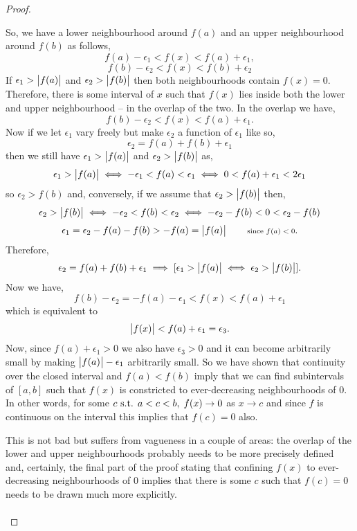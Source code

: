 \documentclass[../MathsNotesBase.tex]{subfiles}
\begin{document}
{\begin{proof}
\begin{displayquote}
				So, we have a lower neighbourhood around $f(a)$ and an upper neighbourhood around $f(b)$ as follows,
				\[ f(a) - \epsilon_1 < f(x) < f(a) + \epsilon_1, \]
				\[ f(b) - \epsilon_2 < f(x) < f(b) + \epsilon_2 \]
				If ${ \epsilon_1 > \left\lvert f(a)\right\rvert }$ and ${ \epsilon_2 > \left\lvert f(b)\right\rvert }$ then both neighbourhoods contain ${ f(x) = 0 }$. Therefore, there is some interval of $x$ such that ${ f(x) }$ lies inside both the lower and upper neighbourhood -- in the overlap of the two. In the overlap we have,
				\[ f(b) - \epsilon_2 < f(x) < f(a) + \epsilon_1. \]
				Now if we let $\epsilon_1$ vary freely but make $\epsilon_2$ a function of $\epsilon_1$ like so,
				\[ \epsilon_2 = f(a) + f(b) + \epsilon_1 \]
				then we still have ${ \epsilon_1 > \left\lvert f(a)\right\rvert }$ and ${ \epsilon_2 > \left\lvert f(b)\right\rvert }$ as,
				\[ \epsilon_1 > \left\lvert f(a)\right\rvert \iff -\epsilon_1 < f(a) < \epsilon_1 \iff 0 < f(a) + \epsilon_1 < 2\epsilon_1 \]
				so ${ \epsilon_2 > f(b) }$ and, conversely, if we assume that ${ \epsilon_2 > \left\lvert f(b)\right\rvert }$ then,
				\[ \epsilon_2 > \left\lvert f(b)\right\rvert \iff -\epsilon_2 < f(b) < \epsilon_2 \iff -\epsilon_2 - f(b) < 0 < \epsilon_2 - f(b) \]
				\[ \epsilon_1 = \epsilon_2 - f(a) - f(b) > -f(a) = \left\lvert f(a)\right\rvert \hspace{20pt}\text{\scriptsize{since ${ f(a) < 0 }$}}. \]
				Therefore,
				\[ \epsilon_2 = f(a) + f(b) + \epsilon_1 \implies [ \epsilon_1 > \left\lvert f(a)\right\rvert \iff \epsilon_2 > \left\lvert f(b)\right\rvert ]. \]
				Now we have,
				\[ f(b) - \epsilon_2 = -f(a) - \epsilon_1 < f(x) < f(a) + \epsilon_1 \]
				which is equivalent to
				\[ \left\lvert f(x)\right\rvert < f(a) + \epsilon_1 = \epsilon_3. \]
				Now, since ${ f(a) + \epsilon_1 > 0 }$ we also have ${ \epsilon_3 > 0 }$ and it can become arbitrarily small by making ${ \left\lvert f(a)\right\rvert - \epsilon_1 }$ arbitrarily small. So we have shown that continuity over the closed interval and ${ f(a) < f(b) }$ imply that we can find subintervals of ${ [a,b] }$ such that ${ f(x) }$ is constricted to ever-decreasing neighbourhoods of 0. In other words, for some ${c \text{ s.t. } a < c < b, \; f(x) \to 0 }$ as  ${ x \to c }$ and since $f$ is continuous on the interval this implies that ${ f(c) = 0 }$ also. 
			\end{displayquote}
			This is not bad but suffers from vagueness in a couple of areas: the overlap of the lower and upper neighbourhoods probably needs to be more precisely defined and, certainly, the final part of the proof stating that confining $f(x)$ to ever-decreasing neighbourhoods of 0 implies that there is some $c$ such that ${ f(c) = 0 }$ needs to be drawn much more explicitly.\\\\

\end{proof}}
\end{document}
